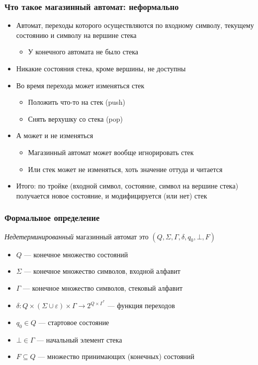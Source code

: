 \documentclass[dvipsnames]{beamer}
\begin{document}
\begin{frame}[fragile]
  \frametitle{Что такое магазинный автомат: неформально}
\begin{itemize}
	\item Автомат, переходы которого осуществляются по входному символу, текущему состоянию и символу на вершине стека
	\begin{itemize}
		\item У конечного автомата не было стека
	\end{itemize}
	\item Никакие состояния стека, кроме вершины, не доступны
	\item Во время перехода может изменяться стек
	\begin{itemize}
		\item Положить что-то на стек (push)
		\item Снять верхушку со стека (pop)
	\end{itemize}
	\item А может и не изменяться
	\begin{itemize}
		\item Магазинный автомат может вообще игнорировать стек
		\item Или стек может не изменяться, хоть значение оттуда и читается
	\end{itemize}
	\item Итого: по тройке (входной символ, состояние, символ на вершине стека) получается новое состояние, и модифицируется (или нет) стек
\end{itemize}
\end{frame}

\begin{frame}[fragile]
  \frametitle{Формальное определение}
  \emph{Недетерминированный} магазинный автомат это $(Q, \Sigma, \Gamma, \delta, q_0, \bot, F)$
  \begin{itemize}
    \item $Q$ --- конечное множество состояний
    \item $\Sigma$ --- конечное множество символов, входной алфавит
    \item $\Gamma$ --- конечное множество символов, стековый алфавит
    \item $\delta: Q \times (\Sigma \cup \varepsilon) \times \Gamma \to 2^{Q \times \Gamma^*}$ --- функция переходов
    \item $q_0 \in Q$ --- стартовое состояние
    \item $\bot \in \Gamma$ --- начальный элемент стека
    \item $F \subseteq Q$ --- множество принимающих (конечных) состояний
  \end{itemize}
\end{frame}
\end{document}
